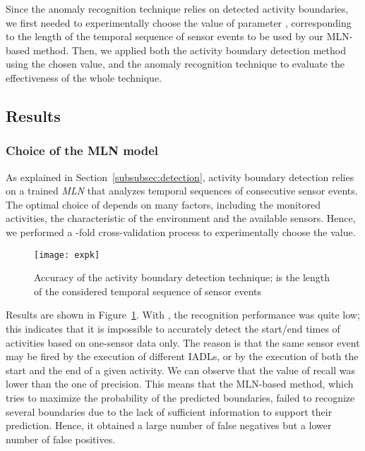 \documentclass[10pt, conference, compsocconf]{IEEEtran}
\begin{document}
Since the anomaly recognition technique relies on detected activity boundaries,
we first needed to experimentally choose the value of parameter , 
corresponding to the length of the temporal sequence of sensor events to be used by 
our MLN-based method.
Then, we applied both the activity boundary detection method using the chosen  value, 
and the anomaly recognition technique to evaluate the effectiveness of the whole technique.


\subsection{Results}
\label{subsec:expres}




\subsubsection{Choice of the MLN model}
As explained in Section~\ref{subsubsec:detection}, activity boundary detection relies on a trained \emph{MLN} that analyzes temporal sequences of  consecutive sensor events. 
The optimal choice of  depends on many factors, including the monitored activities, the characteristic of the environment and the available sensors. Hence, we performed a -fold cross-validation process to experimentally choose the  value. 


\begin{figure}[t!]
  \centering
     \texttt{[image: expk]}
  \caption{Accuracy of the activity boundary detection technique;  is the length of the considered temporal sequence of sensor events}
  \label{fig:plot-cv}
\end{figure}

Results are shown in Figure~\ref{fig:plot-cv}. With , the recognition performance
was quite low; this indicates that it is impossible to accurately detect the start/end
times of activities based on one-sensor data only. The reason is that the same sensor event 
may be fired by the execution of different IADLs, or by the execution of both the
start and the end of a given activity. We can observe that the value of recall was lower
than the one of precision. This means that the MLN-based method, which tries to maximize the
probability of the predicted boundaries, failed to recognize several boundaries due to the
lack of sufficient information to support their prediction. Hence, it obtained a large
number of false negatives but a lower number of false positives.
\end{document}

